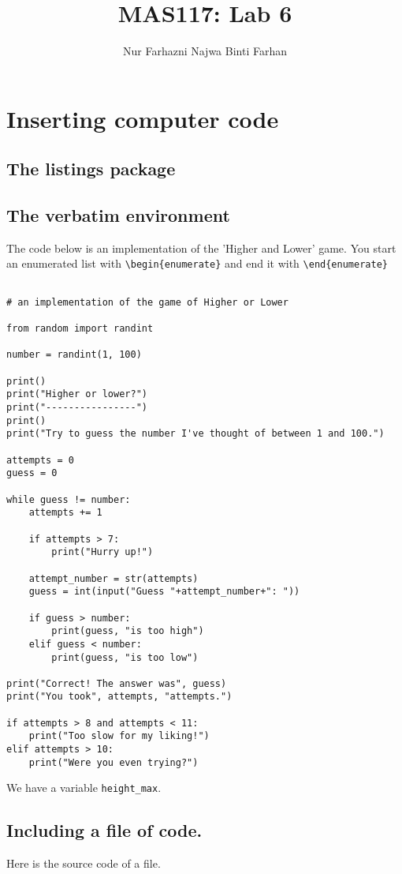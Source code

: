\documentclass[11pt, a4paper]{amsart}
\title{MAS117: Lab 6}
\author{Nur Farhazni Najwa Binti Farhan}
\begin{document}
 
\maketitle
\section{Inserting computer code}
\subsection{The listings package}
\subsection{The verbatim environment}
The code below is an implementation of the 'Higher and Lower' game.
You start an enumerated list with \verb!\begin{enumerate}!
and end it with \verb+\end{enumerate}+
\begin{lstlisting}

# an implementation of the game of Higher or Lower

from random import randint

number = randint(1, 100)

print()
print("Higher or lower?")
print("----------------")
print()
print("Try to guess the number I've thought of between 1 and 100.")

attempts = 0
guess = 0

while guess != number:
    attempts += 1

    if attempts > 7:
        print("Hurry up!")

    attempt_number = str(attempts)
    guess = int(input("Guess "+attempt_number+": "))

    if guess > number:
        print(guess, "is too high")
    elif guess < number:
        print(guess, "is too low")

print("Correct! The answer was", guess)
print("You took", attempts, "attempts.")

if attempts > 8 and attempts < 11:
    print("Too slow for my liking!")
elif attempts > 10:
    print("Were you even trying?")
\end{lstlisting}
We have a variable \lstinline!height_max!.

\subsection{Including a file of code.}
Here is the source code of a file.

\end{document}
